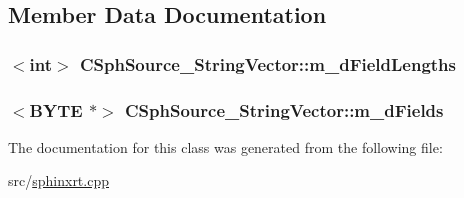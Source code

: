 \subsection{Member Data Documentation}
\hypertarget{classCSphSource__StringVector_ae131a38955cc2d6332a7d5afd4bff95f}{
\subsubsection[{m\-\_\-d\-Field\-Lengths}]{$<${\bf int}$>$ C\-Sph\-Source\-\_\-\-String\-Vector\-::m\-\_\-d\-Field\-Lengths\hspace{0.3cm}{\ttfamily [protected]}}}\label{classCSphSource__StringVector_ae131a38955cc2d6332a7d5afd4bff95f}
\hypertarget{classCSphSource__StringVector_acbc5bb8b27ad10b3c749befa33616ad5}{
\subsubsection[{m\-\_\-d\-Fields}]{$<${\bf B\-Y\-T\-E} $\ast$$>$ C\-Sph\-Source\-\_\-\-String\-Vector\-::m\-\_\-d\-Fields\hspace{0.3cm}{\ttfamily [protected]}}}\label{classCSphSource__StringVector_acbc5bb8b27ad10b3c749befa33616ad5}


The documentation for this class was generated from the following file\-:\begin{DoxyCompactItemize}
\item 
src/\hyperlink{sphinxrt_8cpp}{sphinxrt.\-cpp}\end{DoxyCompactItemize}
